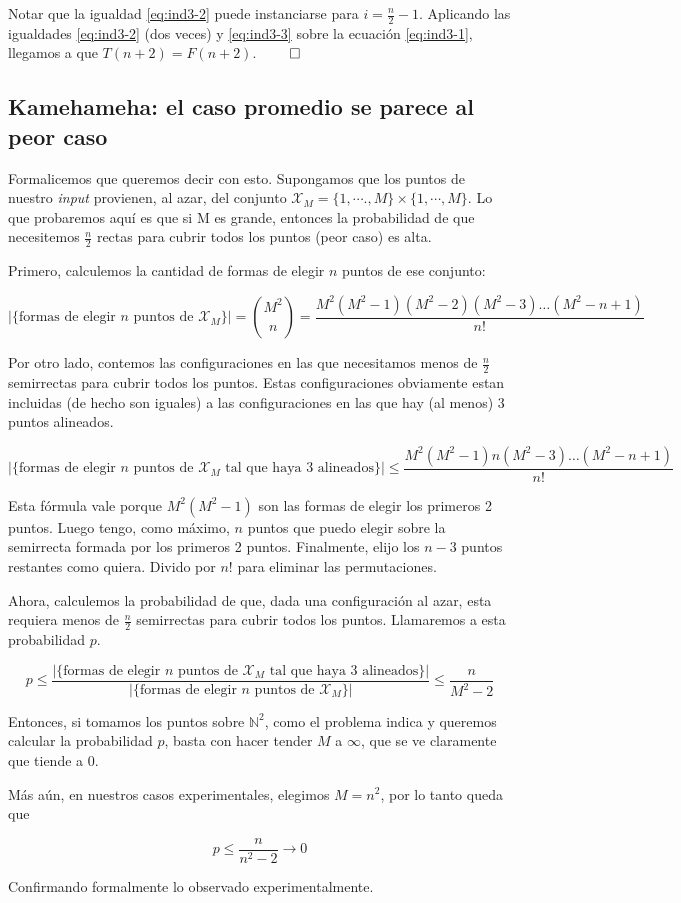   Notar que la igualdad \ref{eq:ind3-2} puede instanciarse para $i = \frac{n}{2}-1$. 
  Aplicando las igualdades \ref{eq:ind3-2} (dos veces) y \ref{eq:ind3-3} sobre la ecuación \ref{eq:ind3-1}, llegamos a que $T(n + 2) = F(n + 2)$. $\qed$


\subsection{Kamehameha: el caso promedio se parece al peor caso}

Formalicemos que queremos decir con esto. Supongamos que los puntos de nuestro \emph{input} provienen, al azar, del conjunto $\mathcal{X}_M = \{1, \cdots., M\} \times \{1, \cdots, M\}$. Lo que probaremos aquí es que si M es grande, entonces la probabilidad de que necesitemos $\frac{n}{2}$ rectas para cubrir todos los puntos (peor caso) es alta.

Primero, calculemos la cantidad de formas de elegir $n$ puntos de ese conjunto:

\[|\{\text{formas de elegir $n$ puntos de $\mathcal{X}_M$} \}| = \binom{M^2}{n} = \frac{M^2 (M^2 - 1) (M^2 - 2) (M^2 - 3) \dots (M^2 - n + 1)}{n!}\]

Por otro lado, contemos las configuraciones en las que necesitamos menos de $\frac{n}2$ semirrectas para cubrir todos los puntos. Estas configuraciones obviamente estan incluidas (de hecho son iguales) a las configuraciones en las que hay (al menos) 3 puntos alineados.

\[|\{\text{formas de elegir $n$ puntos de $\mathcal{X}_M$ tal que haya 3 alineados}\}| \leq \frac{M^2 (M^2 - 1) n (M^2 - 3) \dots (M^2 - n + 1)}{n!}\]

Esta fórmula vale porque $M^2 (M^2 - 1)$ son las formas de elegir los primeros 2 puntos. Luego tengo, como máximo, $n$ puntos que puedo elegir sobre la semirrecta formada por los primeros 2 puntos. Finalmente, elijo los $n - 3$ puntos restantes como quiera. Divido por $n!$ para eliminar las permutaciones.

Ahora, calculemos la probabilidad de que, dada una configuración al azar, esta requiera menos de $\frac{n}2$ semirrectas para cubrir todos los puntos. Llamaremos a esta probabilidad $p$.

\[p \leq \frac{|\{\text{formas de elegir $n$ puntos de $\mathcal{X}_M$ tal que haya 3 alineados} \}|}{|\{\text{formas de elegir $n$ puntos de $\mathcal{X}_M$} \}|} \leq \frac{n} {M^2 - 2}\]


Entonces, si tomamos los puntos sobre $\mathbb{N}^2$, como el problema indica y queremos calcular la probabilidad $p$, basta con hacer tender $M$ a $\infty$, que se ve claramente que tiende a 0.

Más aún, en nuestros casos experimentales, elegimos $M = n^2$, por lo tanto queda que

\[p \leq \frac{n} {n^2 - 2} \to 0\]

Confirmando formalmente lo observado experimentalmente.


